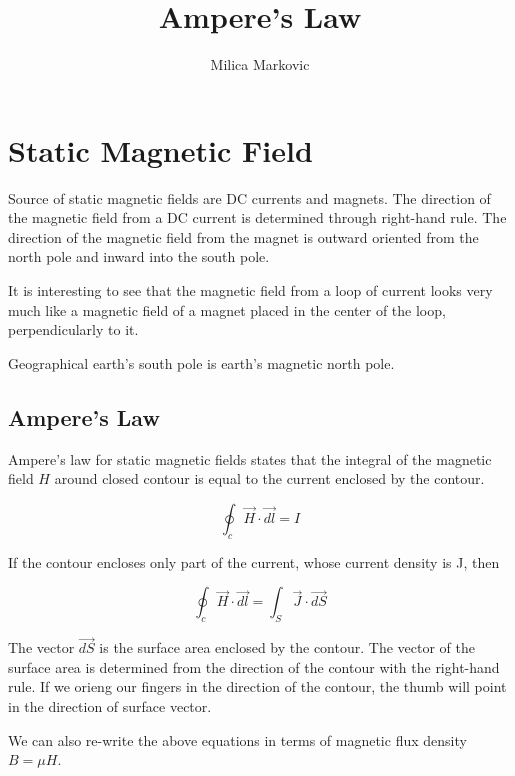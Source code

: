 \documentclass{ximera}
\title{Ampere's Law}
\author{Milica Markovic}
\begin{document}
  
\begin{abstract}  

\end{abstract}  
\maketitle    


\section{Static Magnetic Field}

Source of static magnetic fields are DC currents and magnets. The direction of the magnetic field from a DC current is determined through right-hand rule. The direction of the magnetic field from the magnet is outward oriented from the north pole and inward into the south pole.

It is interesting to see that the magnetic field from a loop of current looks very much like a magnetic field of a magnet placed in the center of the loop, perpendicularly to it. 

Geographical earth's south pole is earth's magnetic north pole.


\subsection{Ampere's Law}


Ampere's law for static magnetic fields states that the integral of the magnetic field $H$ around closed contour is equal to the current enclosed by the contour.

\begin{equation}
\oint_c \vec{H} \cdot \vec{dl} = I
\end{equation}


If the contour encloses only part of the current, whose current density is J, then


\begin{equation}
\oint_c \vec{H} \cdot \vec{dl} = \int_S \vec{J} \cdot \vec{dS}
\end{equation}


The vector $\vec{dS}$ is the surface area enclosed by the contour. The vector of the surface area is determined from the direction of the contour with the right-hand rule. If we orieng our fingers in the direction of the contour, the thumb will point in the direction of surface vector.


We can also re-write the above equations in terms of magnetic flux density $B=\mu H$.
\end{document}
